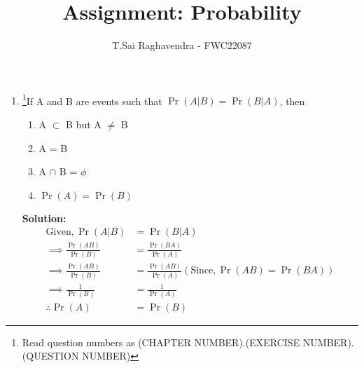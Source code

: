 \documentclass{article}
\providecommand{\pr}[1]{\ensuremath{\Pr\left(#1\right)}}
\newcommand{\solution}{\noindent \textbf{Solution: }}
\begin{document}
\title{Assignment: Probability}
\author{\Large T.Sai Raghavendra - FWC22087}
\date{}


\maketitle
\begin{enumerate}[label=13.\arabic{enumi}.\arabic{enumii}]%
\setcounter{enumi}{0}
\setcounter{enumii}{17}


\item \footnote{Read question numbers as (CHAPTER NUMBER).(EXERCISE NUMBER).(QUESTION NUMBER)}If A and B are events such that $\pr{A|B} = \pr{B|A}$, then\\
\begin{enumerate}
\item A $\subset$ B but A $\not=$ B
\item A = B
\item A $\cap$ B = $\phi$
\item $\pr{A}=\pr{B}$
\end{enumerate}

\solution \begin{align}
\text{Given}, \pr{A|B} &= \pr{B|A}\\
\implies  \frac{\pr{AB}}{\pr{B}} &= \frac{\pr{BA}}{\pr{A}}\\ 
\implies  \frac{\pr{AB}}{\pr{B}} &= \frac{\pr{AB}}{\pr{A}} (\text{Since}, \pr{AB} = \pr{BA})\\
\implies  \frac{1}{\pr{B}} &= \frac{1}{\pr{A}}\\
\therefore  \pr{A} &= \pr{B}
\end{align}
\end{enumerate}
\end{document}
